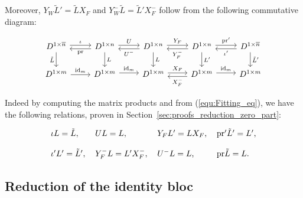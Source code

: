 \documentclass{ifacconf}
\newcommand\id[1]{\text{id}_{#1}}
\newcommand\p{\text{pr}}
\begin{document}
\begin{pf}
  Moreover, $Y_W\tilde{L}'=\tilde{L}X_F$ and $Y_W^-\tilde{L}=\tilde{L}'
  X_F^-$ follow from the following commutative diagram:
  \vspace{-0.4cm}
  \begin{small}
    \begin{center}
      \[
        \begin{tikzcd}
          D^{1\times\overline{n}}\arrow[d, "\tilde{L}"']\arrow[r, "\iota", shift right=-0.5ex] &
          D^{1\times n}\arrow[d, "L"]\arrow[r, "U", shift right=-0.5ex]
          \arrow[l, "\p", shift left=0.5ex] &
          D^{1\times n}\arrow[d, "L"]\arrow[r, "Y_F", shift right=-0.5ex] 
          \arrow[l, "U^-", shift right=-0.5ex] &
          D^{1\times n}\arrow[d, "L'"]\arrow[r, "\p'", shift right=-0.5ex] 
          \arrow[l, "Y_F^-", shift right=-0.5ex] &
          D^{1\times\overline{n}}\arrow[d, "\tilde{L}'"]
          \arrow[l, "\iota'", shift right=-0.5ex] 
          \\
          D^{1\times m}\arrow[r, "\id{m}"] &
          D^{1\times m}\arrow[r, "\id{m}", shift right=-0.5ex]
          &
          D^{1\times m}\arrow[r, "X_F", shift right=-0.5ex]
          &
          D^{1\times m}\arrow[r, "\id{m}", shift right=-0.5ex]
          \arrow[l, "X_F^-", shift right=-0.5ex] &
          D^{1\times m}
        \end{tikzcd}
      \]
    \end{center}
  \end{small}
  Indeed by computing the matrix products and
  from (\ref{equ:Fitting_eq}), we have the following relations, proven in
  Section~\ref{sec:proofs_reduction_zero_part}:
  \begin{small}
    \begin{equation}
      \label{eq:formulas_reduction_zero_part}
      \begin{tabular}{l l l l}
        $\iota L=\tilde{L},$ & $UL=L,$ & $Y_FL'=LX_F$, & $\p'\tilde{L}'=L'$,\\
        & & \\
        $\iota'L'=\tilde{L}',$ & $Y_F^-L=L'X_F^-,$ & $U^-L=L$, & $\p\tilde{L}
        =L$.
      \end{tabular}
    \end{equation}
  \end{small}
\end{pf}

\subsection{Reduction of the identity bloc}
\end{document}
